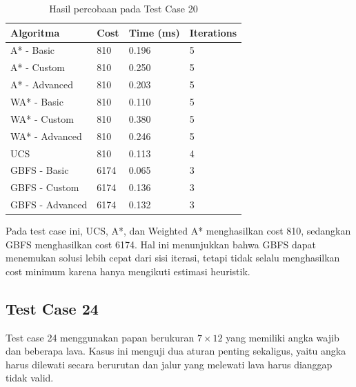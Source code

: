 \begin{table}[H]
	\centering
	\caption{Hasil percobaan pada Test Case 20}
	\small
	\begin{tabular}{|p{4cm}|p{2.5cm}|p{2.5cm}|p{2.5cm}|}
		\hline
		\rowcolor{gray!20}
		\textbf{Algoritma} & \textbf{Cost} & \textbf{Time (ms)} & \textbf{Iterations} \\
		\hline
		A* - Basic & 810 & 0.196 & 5 \\
		\hline
		A* - Custom & 810 & 0.250 & 5 \\
		\hline
		A* - Advanced & 810 & 0.203 & 5 \\
		\hline
		WA* - Basic & 810 & 0.110 & 5 \\
		\hline
		WA* - Custom & 810 & 0.380 & 5 \\
		\hline
		WA* - Advanced & 810 & 0.246 & 5 \\
		\hline
		UCS & 810 & 0.113 & 4 \\
		\hline
		GBFS - Basic & 6174 & 0.065 & 3 \\
		\hline
		GBFS - Custom & 6174 & 0.136 & 3 \\
		\hline
		GBFS - Advanced & 6174 & 0.132 & 3 \\
		\hline
	\end{tabular}
\end{table}

\begin{tcolorbox}[
	colback=orange!5,
	colframe=orange!70!black,
	title=\textbf{Ringkasan Test Case 20},
	arc=2mm,
	boxrule=0.8pt
]
Pada test case ini, UCS, A*, dan Weighted A* menghasilkan cost 810, sedangkan GBFS menghasilkan cost 6174. 
Hal ini menunjukkan bahwa GBFS dapat menemukan solusi lebih cepat dari sisi iterasi, tetapi tidak selalu menghasilkan cost minimum karena hanya mengikuti estimasi heuristik.
\end{tcolorbox}


\subsection{Test Case 24}

\begin{tcolorbox}[
	colback=blue!5,
	colframe=blue!60!black,
	title=\textbf{Ringkasan Input Test Case 24},
	arc=2mm,
	boxrule=0.8pt
]
Test case 24 menggunakan papan berukuran $7 \times 12$ yang memiliki angka wajib dan beberapa lava. 
Kasus ini menguji dua aturan penting sekaligus, yaitu angka harus dilewati secara berurutan dan jalur yang melewati lava harus dianggap tidak valid.
\end{tcolorbox}

